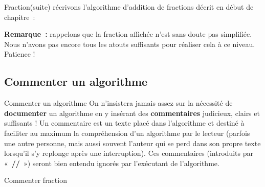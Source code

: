 \begin{frame}{Fraction(suite)}
	récrivons l’algorithme d’addition de fractions décrit
	en début de chapitre~:

	
	\textbf{Remarque~:}
	rappelons que la fraction affichée n'est sans doute pas simplifiée. 
	Nous n'avons pas encore tous les atouts suffisants pour réaliser 
	cela à ce niveau. Patience !
\end{frame}

\subsection{Commenter un algorithme}
\begin{frame}{Commenter un algorithme}
	On n’insistera jamais assez sur la nécessité de \textbf{documenter} un
	algorithme en y insérant des \textbf{commentaires} judicieux, clairs et
	suffisants ! Un commentaire est un texte placé dans
	l'algorithme et destiné à faciliter au maximum la
	compréhension d’un algorithme par le lecteur (parfois une autre
	personne, mais aussi souvent l'auteur qui se perd dans
	son propre texte lorsqu'il s'y replonge après une
	interruption). Ces commentaires (introduits par
	«~\textbf{//}~») seront bien entendu ignorés par
	l’exécutant de l’algorithme.
\end{frame}

\begin{frame}{Commenter fraction}
\end{frame}

